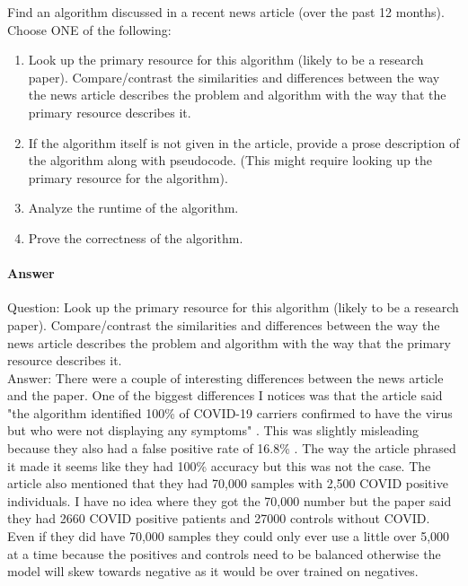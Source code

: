 \documentclass{article}
\begin{document}

\nextprob
{}

Find an algorithm discussed in a recent news article (over the past 12 months).
Choose ONE of the following:
\begin{enumerate}
    \item Look up the primary resource for this algorithm (likely to be a research paper).
    Compare/contrast the similarities and differences between the way the news article describes the problem and algorithm with the way that the primary resource describes it.
    \item If the algorithm itself is not given in the article, provide a prose description of the algorithm along with pseudocode.
    (This might require looking up the primary resource for the algorithm).
    \item Analyze the runtime of the algorithm.
    \item Prove the correctness of the algorithm.
\end{enumerate}

\paragraph{Answer}

	Question: Look up the primary resource for this algorithm (likely to be a research paper).
	Compare/contrast the similarities and differences between the way the news article describes the problem and algorithm with the way that the primary resource describes it.\\
	Answer:
	There were a couple of interesting differences between the news article and the paper. One of the biggest differences I notices was that the article said "the algorithm identified 100\% of COVID-19 carriers confirmed to have the virus but who were not displaying any symptoms" \cite{osborne_2020}. This was slightly misleading because they also had a false positive rate of 16.8\% \cite{9208795}. The way the article phrased it made it seems like they had 100\% accuracy but this was not the case. The article also mentioned that they had 70,000 samples with 2,500 COVID positive individuals. I have no idea where they got the 70,000 number but the paper said they had 2660 COVID positive patients and 27000 controls without COVID. Even if they did have 70,000 samples they could only ever use a little over 5,000 at a time because the positives and controls need to be balanced otherwise the model will skew towards negative as it would be over trained on negatives. 
	
\end{document}
